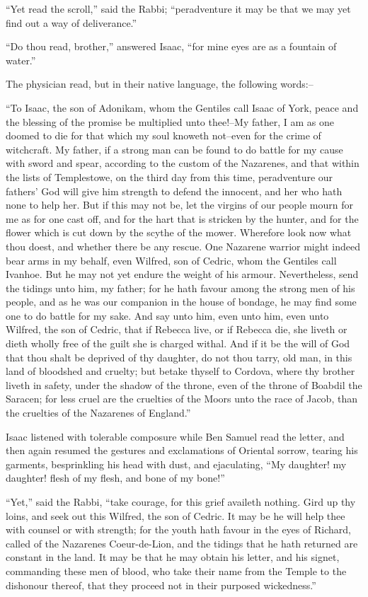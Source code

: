 ``Yet read the scroll,'' said the Rabbi; ``peradventure it may be that
we may yet find out a way of deliverance.''

``Do thou read, brother,'' answered Isaac, ``for mine eyes are as a
fountain of water.''

The physician read, but in their native language, the following words:--

``To Isaac, the son of Adonikam, whom the Gentiles call Isaac of York,
peace and the blessing of the promise be multiplied unto thee!--My
father, I am as one doomed to die for that which my soul knoweth
not--even for the crime of witchcraft. My father, if a strong man can be
found to do battle for my cause with sword and spear, according to the
custom of the Nazarenes, and that within the lists of Templestowe, on
the third day from this time, peradventure our fathers' God will give
him strength to defend the innocent, and her who hath none to help her.
But if this may not be, let the virgins of our people mourn for me as
for one cast off, and for the hart that is stricken by the hunter, and
for the flower which is cut down by the scythe of the mower. Wherefore
look now what thou doest, and whether there be any rescue. One Nazarene
warrior might indeed bear arms in my behalf, even Wilfred, son of
Cedric, whom the Gentiles call Ivanhoe. But he may not yet endure the
weight of his armour. Nevertheless, send the tidings unto him, my
father; for he hath favour among the strong men of his people, and as he
was our companion in the house of bondage, he may find some one to do
battle for my sake. And say unto him, even unto him, even unto Wilfred,
the son of Cedric, that if Rebecca live, or if Rebecca die, she liveth
or dieth wholly free of the guilt she is charged withal. And if it be
the will of God that thou shalt be deprived of thy daughter, do not thou
tarry, old man, in this land of bloodshed and cruelty; but betake
thyself to Cordova, where thy brother liveth in safety, under the shadow
of the throne, even of the throne of Boabdil the Saracen; for less cruel
are the cruelties of the Moors unto the race of Jacob, than the
cruelties of the Nazarenes of England.''

Isaac listened with tolerable composure while Ben Samuel read the
letter, and then again resumed the gestures and exclamations of Oriental
sorrow, tearing his garments, besprinkling his head with dust, and
ejaculating, ``My daughter! my daughter! flesh of my flesh, and bone of
my bone!''

``Yet,'' said the Rabbi, ``take courage, for this grief availeth
nothing. Gird up thy loins, and seek out this Wilfred, the son of
Cedric. It may be he will help thee with counsel or with strength; for
the youth hath favour in the eyes of Richard, called of the Nazarenes
Coeur-de-Lion, and the tidings that he hath returned are constant in the
land. It may be that he may obtain his letter, and his signet,
commanding these men of blood, who take their name from the Temple to
the dishonour thereof, that they proceed not in their purposed
wickedness.''

